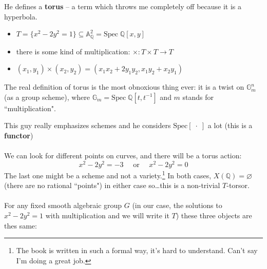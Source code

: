 \documentclass[12pt]{article}
\begin{document}
He defines a \textbf{torus} -- a term which throws me completely off because it is a hyperbola.
\begin{itemize}
\item $T = \{ x^2 -2y^2 = 1 \} \subseteq \mathbb{A}_\mathbb{Q}^2 = \mathrm{Spec} \; \mathbb{Q}[x,y]$
\item there is some kind of multiplication: $\mathbf{\times}: T \times T \to T$
\item $(x_1,y_1) \times (x_2,y_2) = ( x_1 x_2 + 2 y_1 y_2 , x_1 y_2 + x_2 y_1)$
\end{itemize}
The real definition of torus is the most obnoxious thing ever: it is a twist on $\mathbb{G}_m^n$ (as a group scheme), where $\mathbb{G}_m = \mathrm{Spec}\; \mathbb{Q}[t, t^{-1}] $ and $m$ stands for ``multiplication".
\newpage

\noindent This guy really emphasizes schemes and he considers $\mathrm{Spec}[ \; \cdot \; ]$ a lot (this is a \textbf{functor})\\ \\We can look for different points on curves, and there will be a torus action:
$$ x^2 - 2y^2 = - 3 \quad\text{ or }\quad x^2 - 2y^2 = 0 $$
The last one might be a scheme and not a variety.\footnote{The book is written in such a formal way, it's hard to understand.  Can't say I'm doing a great job.}  In both cases, $X(\mathbb{Q}) = \varnothing$ (there are no rational ``points") in either case so\dots this is a non-trivial $T$-torsor. \\ \\
For any fixed smooth algebraic group $G$ (in our case, the solutions to $x^2 - 2y^2 = 1$ with multiplication and we will write it $T$) these three objects are thes same: 
\end{document}
